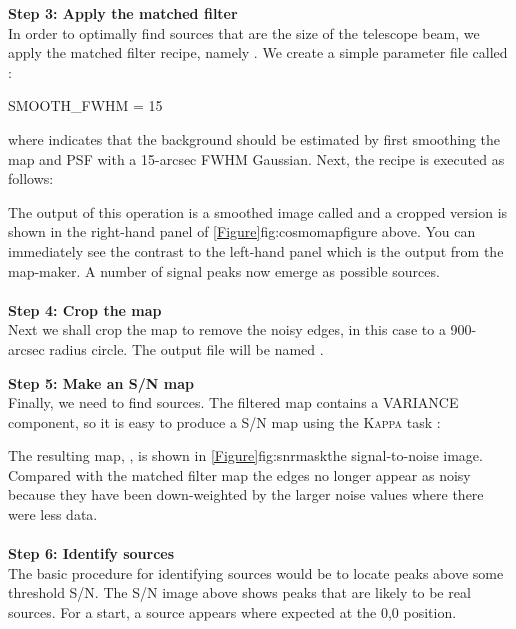 \documentclass[11pt,oneside,chapters]{starlink}
\begin{document}
\textbf{Step 3: Apply the matched filter}\\
In order to optimally find sources that are the size of the telescope
beam, we apply the matched filter recipe, namely
.
We create a simple parameter file called :

\begin{terminalv}
SMOOTH_FWHM = 15
\end{terminalv}
where  indicates that the background should be
estimated by first smoothing the map and PSF with a 15-arcsec FWHM
Gaussian. Next, the recipe is executed as follows:
%
\begin{terminalv}
\end{terminalv}
%
The output of this operation is a smoothed image called
 and a cropped version is shown in the
right-hand panel of \cref{Figure}{fig:cosmomap}{figure above}. You can immediately
see the contrast to the left-hand panel which is the output from the
map-maker. A number of signal peaks now emerge as possible sources.
\\ \\
\textbf{Step 4: Crop the map}\\
Next we shall crop the map to remove the noisy edges,
in this case to a 900-arcsec radius circle. The output file will be named
.
\begin{terminalv}

\end{terminalv}


\textbf{Step 5: Make an S/N map}\\
Finally, we need to find sources. The filtered map contains a
VARIANCE component, so it is easy to produce a S/N map using the
\textsc{Kappa} task \makesnr:
\begin{terminalv}
\end{terminalv}

The resulting map, , is shown in
\cref{Figure}{fig:snrmask}{the signal-to-noise image}. Compared with the
matched filter map the
edges no longer appear as noisy because they have been down-weighted
by the larger noise values where there were less data.
\\ \\
\textbf{Step 6: Identify sources}\\
The basic procedure for identifying sources would be to locate peaks
above some threshold S/N. The S/N image above shows peaks that are
likely to be real sources. For a start, a source appears where
expected at the 0,0 position.
\end{document}
